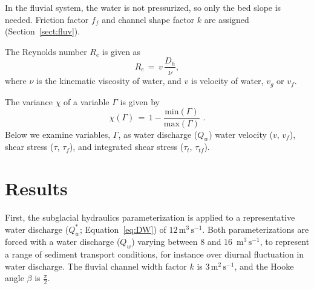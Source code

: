 \documentclass[11pt]{article}
\newcommand{\unit}[1]{$\mathrm{#1}$}
\begin{document}
\begin{spacing}{1}
  In the fluvial system, the water is not pressurized, so only the bed slope is needed. Friction factor $f_f$ and channel shape factor $k$ are assigned (Section~\ref{sect:fluv}).
  
  The Reynolds number $R_e$ is given as 
  \begin{equation}
    \label{eq:re}
    R_e\,=\, v \,\frac{D_h}{\nu},
  \end{equation}
  \noindent where $\nu$ is the kinematic viscosity of water, and  $v$ is velocity of water, $v_g$ or $v_f$.
  
  The variance $ \chi$ of a variable $\Gamma$ is given by 
  \begin{equation}
    \label{eq:var}
    \chi(\Gamma) \,=\, 1 - \frac{\mathrm{min}(\Gamma)}{\mathrm{max}(\Gamma)}\,\,.
  \end{equation}
  \noindent Below we examine variables, $\Gamma$, as water discharge ($Q_w$) water velocity ($v$, $v_f$), shear stress ($\tau$, $\tau_f$), and integrated shear stress ($\tau_t$, $\tau_{tf}$).
  
  
  \section{Results}
  First, the subglacial hydraulics parameterization is applied to a representative water discharge ($Q_w^*$; Equation~\ref{eq:DW}) of $12$\,\unit{m}$^{3}$\,\unit{s}$^{-1}$.
  Both parameterizations are forced with a water discharge ($Q_w$) varying between $8$ and $16$ \,\unit{m}$^{3}$\,\unit{s}$^{-1}$, to represent a range of sediment transport conditions, for instance over diurnal fluctuation in water discharge. The fluvial channel width factor $k$ is $3$\,\unit{m}$^{2}$\,\unit{s}$^{-1}$, and the Hooke angle $\beta$ is $\frac{\pi}{2}$.
  

\end{spacing}
\end{document}
